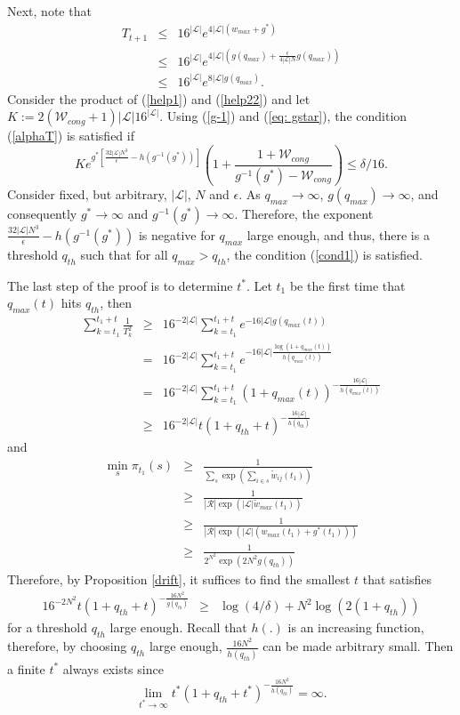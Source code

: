 \documentclass[10pt,onecolumn,draftclsnofoot,journal]{IEEEtran}
\newcommand{\mW} {\mathcal{W}}
\newcommand{\be}{\begin{eqnarray}}
\newcommand{\ee}{\end{eqnarray}}
\newcommand{\ben}{\begin{eqnarray*}}
\newcommand{\een}{\end{eqnarray*}}
\begin{document}
Next, note that
\be
T_{t+1} &\leq& 16^{|\mathcal{L}|}e^{4 |\mathcal{L}|(w_{max}+g^*)} \nonumber \\
& \leq & 16^{|\mathcal{L}|}e^{4 |\mathcal{L}|(g(q_{max})+\frac{\epsilon}{4|\mathcal{L}| N }g(q_{max}))} \nonumber \\
& \leq & 16^{|\mathcal{L}|}e^{8 |\mathcal{L}| g(q_{max})} \label{help22}.
\ee
Consider the product of (\ref{help1}) and (\ref{help22}) and let $K:=2 (\mW_{cong}+1)|\mathcal{L}|16^{|\mathcal{L}|}$.
Using (\ref{g-1}) and (\ref{eq: gstar}), the condition (\ref{alphaT}) is satisfied if
\begin{equation}\label{cond1}
Ke^{g^*[\frac{32|\mathcal{L}|N^3}{\epsilon}-h(g^{-1}(g^*))]}\left(1+\frac{1+\mW_{cong}}{g^{-1}(g^*)-\mW_{cong}}\right) \leq \delta/16.
\end{equation}
Consider fixed, but arbitrary, $|\mathcal{L}|$, $N$ and $\epsilon$. As $q_{max} \to \infty$, $g(q_{max}) \to \infty$, and consequently $g^* \to \infty$ and $g^{-1}(g^*) \to \infty$. Therefore, the exponent $\frac{32|\mathcal{L}|N^3}{\epsilon}-h(g^{-1}(g^*))$ is negative for $q_{max}$ large enough, and thus, there is a threshold $q_{th}$ such that for all $q_{max} > q_{th}$, the condition (\ref{cond1}) is satisfied.


The last step of the proof is to determine $t^*$. Let $t_1$ be the first time that $q_{max}(t)$ hits $q_{th}$, then
\begin{eqnarray*}
\sum_{k=t_1}^{t_1+t}\frac{1}{T_k^2} & \geq & 16^{-2|\mathcal{L}|} \sum_{k=t_1}^{t_1+t} e^{-16|\mathcal{L}| g(q_{max}(t))}\\
& = & 16^{-2|\mathcal{L}|} \sum_{k=t_1}^{t_1+t} e^{-16|\mathcal{L}| \frac{\log(1+q_{max}(t))}{h(q_{max}(t))}}\\
& = &16^{-2|\mathcal{L}|} \sum_{k=t_1}^{t_1+t} (1+q_{max}(t))^{-\frac{16|\mathcal{L}| }{h(q_{max}(t))}}\\
 & \geq & 16^{-2|\mathcal{L}|} t (1+q_{th}+t)^{-\frac{16|\mathcal{L}| }{h(q_{th})}}
\end{eqnarray*}
and
\begin{eqnarray*}
\min_{s}\pi_{t_1}(s)& \geq & \frac{1}{\sum_{s}\exp(\sum_{i \in s}\widetilde{w}_{ij}(t_1))}\\
& \geq & \frac{1}{|\mathcal{R}|\exp(|\mathcal{L}|\widetilde{w}_{max}(t_1))}\\
& \geq & \frac{1}{|\mathcal{R}|\exp(|\mathcal{L}|({w}_{max}(t_1)+g^*(t_1)))}\\
& \geq & \frac{1}{2^{N^2}\exp(2N^2 g(q_{th}))}
\end{eqnarray*}
Therefore, by Proposition \ref{drift}, it suffices to find the smallest $t$ that satisfies
\ben
16^{-2N^2} t (1+q_{th}+t)^{-\frac{16N^2 }{g(q_{th})}} &\geq& \log(4/ \delta) + N^2  \log(2(1+q_{th}))
\een
for a threshold $q_{th}$ large enough. Recall that $h(.)$ is an increasing function, therefore, by choosing $q_{th}$ large enough, $\frac{16N^2}{h(q_{th})}$ can be made arbitrary small.
Then a finite $t^*$ always exists since
$$
\lim _{t^* \to \infty} t^* (1+q_{th}+t^*)^{-\frac{16N^2}{h(q_{th})}} = \infty.
$$
\end{document}
